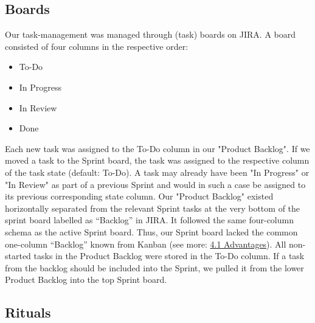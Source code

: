 \documentclass[a4paper]{article}
\begin{document}
\subsection{Boards}
Our task-management was managed through (task) boards on JIRA.
A board consisted of four columns in the respective order:
\begin{itemize}
    \item To-Do
    \item In Progress
    \item In Review
    \item Done
\end{itemize}
Each new task was assigned to the To-Do column in our "Product Backlog". If we moved a task to the Sprint board, the task was assigned to the respective column of the task state (default: To-Do). 
A task may already have been "In Progress" or "In Review" as part of a previous Sprint and would in such a case be assigned to its previous corresponding state column. 
Our "Product Backlog" existed horizontally separated from the relevant Sprint tasks at the very bottom of the sprint board labelled as “Backlog” in JIRA. 
It followed the same four-column schema as the active Sprint board. Thus, our Sprint board lacked the common one-column “Backlog” known from Kanban (see more: \hyperref[sec:advantages]{4.1 Advantages}). 
All non-started tasks in the Product Backlog were stored in the To-Do column. 
If a task from the backlog should be included into the Sprint, we pulled it from the lower Product Backlog into the top Sprint board.
\subsection{Rituals}
\label{sec:rituals}
\end{document}
